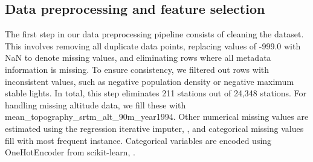 \documentclass[gmd, manuscript]{copernicus}
\begin{document}
\subsection{Data preprocessing and feature selection}
The first step in our data preprocessing pipeline consists of cleaning the dataset. This involves removing all duplicate data points, replacing values of -999.0 with NaN to denote missing values, and eliminating rows where all metadata information is missing. To ensure consistency, we filtered out rows with inconsistent values, such as negative population density or negative maximum stable lights. In total, this step eliminates 211 stations out of 24,348 stations.
For handling missing altitude data, we fill these with mean\_topography\_srtm\_alt\_90m\_year1994. Other numerical missing values are estimated using the regression iterative imputer, \cite{rubinsteynfancyimpute}, and categorical missing values fill with most frequent instance. 
Categorical variables are encoded using OneHotEncoder from scikit-learn, \cite{pedregosa2011scikit}. %
\end{document}
